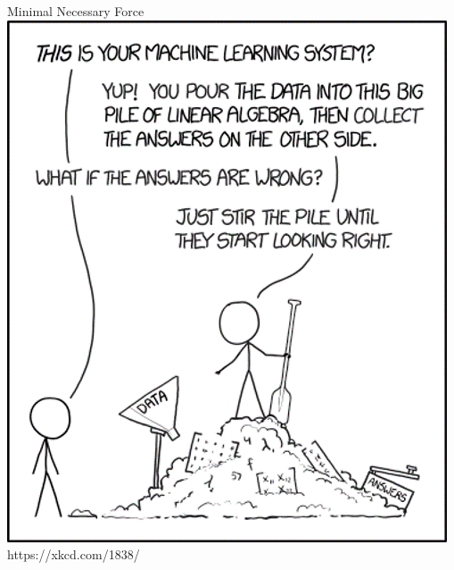 \begin{frame}{Minimal Necessary Force}
   \centering
   \includegraphics[width=0.45\linewidth]{images/xkcd-ml.png}
   \vfill \tiny{https://xkcd.com/1838/}
\end{frame}

